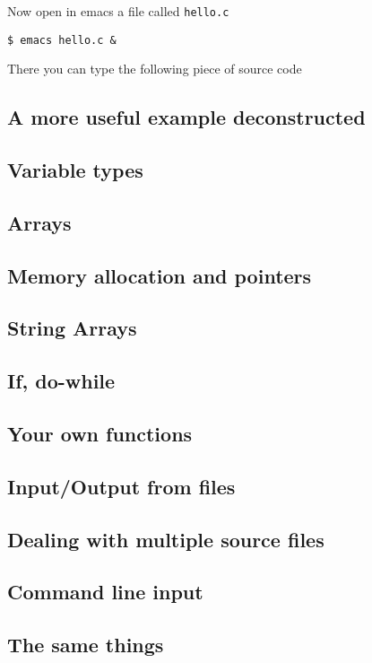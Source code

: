\documentclass{article}
\begin{document}
Now open in emacs a file called \verb"hello.c"
\begin{verbatim}
$ emacs hello.c &
\end{verbatim}

There you can type the following piece of source code


\subsection{A more useful example deconstructed}


\subsection{Variable types}

\subsection{Arrays}

\subsection{Memory allocation and pointers}

\subsection{String Arrays}

\subsection{If, do-while}

\subsection{Your own functions}

\subsection{Input/Output from files}

\subsection{Dealing with multiple source files}

\subsection{Command line input}

\subsection{The same things}
\end{document}
